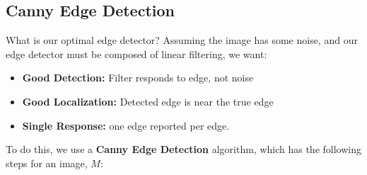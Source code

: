 \documentclass{article}
\begin{document}
\subsection{Canny Edge Detection}
What is our optimal edge detector? Assuming the image has some noise, and our edge detector must be composed of linear filtering, we want:
\begin{itemize}
    \item \textbf{Good Detection:} Filter responds to edge, not noise
    \item \textbf{Good Localization:} Detected edge is near the true edge
    \item \textbf{Single Response:} one edge reported per edge.
\end{itemize}
To do this, we use a \textbf{Canny Edge Detection} algorithm, which has the following steps for an image, $M$:
\end{document}
